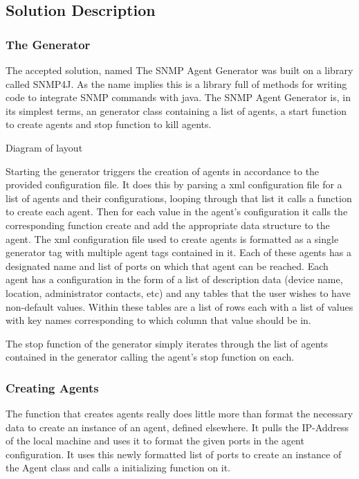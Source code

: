 \documentclass[12pt]{article}
\begin{document}
\subsection{Solution Description}
\subsubsection{The Generator} \indent\indent The accepted solution, named The SNMP Agent Generator was built on a library called SNMP4J. As the name implies this is a library full of methods for writing code to integrate SNMP commands with java. The SNMP Agent Generator is, in its simplest terms, an generator class containing a list of agents, a start function to create agents and stop function to kill agents.

Diagram of layout

Starting the generator triggers the creation of agents in accordance to the provided configuration file. It does this by parsing a xml configuration file for a list of agents and their configurations, looping through that list it calls a function to create each agent. Then for each value in the agent's configuration it calls the corresponding function create and add the appropriate data structure to the agent. The xml configuration file used to create agents is formatted as a single generator tag with multiple agent tags contained in it. Each of these agents has a designated name and list of ports on which that agent can be reached. Each agent has a configuration in the form of a list of description data (device name, location, administrator contacts, etc) and any tables that the user wishes to have non-default values. Within these tables are a list of rows each with a list of values with key names corresponding to which column that value should be in.

The stop function of the generator simply iterates through the list of agents contained in the generator calling the agent's stop function on each.
\subsubsection{Creating Agents} 
The function that creates agents really does little more than format the necessary data to create an instance of an agent, defined elsewhere. It pulls the IP-Address of the local machine and uses it to format the given ports in the agent configuration. It uses this newly formatted list of ports to create an instance of the Agent class and calls a initializing function on it.
\end{document}
